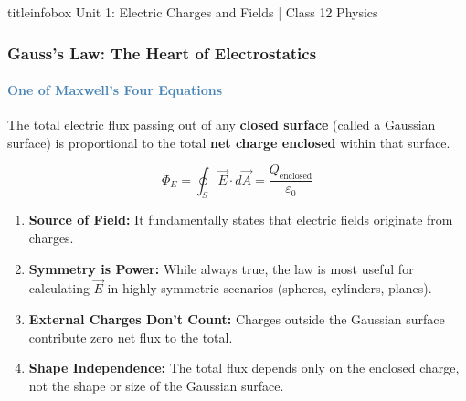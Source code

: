 \begin{frame}
\begin{frame}
\vfill

\begin{beamercolorbox}[wd=\textwidth,ht=0.5cm,dp=0.1cm,center]{titleinfobox}
    \small\color{coolgray} Unit 1: Electric Charges and Fields | Class 12 Physics
\end{beamercolorbox}
\end{frame}

\begin{frame}
\frametitle{\textsf{\textbf{Gauss's Law:} The Heart of Electrostatics}}
\framesubtitle{\textcolor{steelblue}{One of Maxwell's Four Equations}}

\begin{keybox}
\vspace{0.1cm}
The total electric flux passing out of any \textbf{closed surface} (called a Gaussian surface) is proportional to the total \textbf{net charge enclosed} within that surface.
\vspace{0.1cm}
\end{keybox}

\vspace{0.3cm}

\begin{formulabox}
\vspace{0.1cm}
\begin{equation*}
\boxed{\Phi_E = \oint_S \vec{E} \cdot d\vec{A} = \frac{Q_{\text{enclosed}}}{\varepsilon_0}}
\end{equation*}
\end{formulabox}

\vspace{0.3cm}

\begin{importantbox}
\vspace{0.1cm}
\begin{enumerate}
    \item \textbf{Source of Field:} It fundamentally states that electric fields originate from charges.
    \item \textbf{Symmetry is Power:} While always true, the law is most useful for calculating $\vec{E}$ in highly symmetric scenarios (spheres, cylinders, planes).
    \item \textbf{External Charges Don't Count:} Charges outside the Gaussian surface contribute zero net flux to the total.
    \item \textbf{Shape Independence:} The total flux depends only on the enclosed charge, not the shape or size of the Gaussian surface.
\end{enumerate}
\vspace{0.1cm}
\end{importantbox}


\end{frame}
\end{frame}
